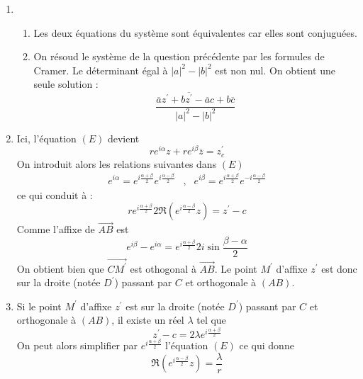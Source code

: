 \begin{enumerate}
 \item \begin{enumerate}
 \item Les deux équations du système sont équivalentes car elles sont conjuguées.
 \item On résoud le système de la question précédente par les formules de Cramer. Le déterminant égal à $|a|^2 -|b|^2$ est non nul.
On obtient une seule solution :
\begin{displaymath}
  \frac{\overline{a}z^\prime + b\overline{z^\prime} -\overline{a}c + b\overline{c}}{|a|^2 -|b|^2}
\end{displaymath}
\end{enumerate}
\item Ici, l'équation $(E)$ devient
\begin{displaymath}
 re^{i\alpha}z + re^{i\beta}\overline{z}=z^\prime _c
\end{displaymath}
On introduit alors les relations suivantes dans $(E)$
\begin{align*}
 e^{i\alpha} = e^{i\frac{\alpha + \beta}{2}}e^{i\frac{\alpha - \beta}{2}} &,&
 e^{i\beta} = e^{i\frac{\alpha + \beta}{2}}e^{-i\frac{\alpha - \beta}{2}}
\end{align*}
ce qui conduit  à :
\begin{displaymath}
 re^{i\frac{\alpha + \beta}{2}}2 \Re (e^{i\frac{\alpha - \beta}{2}}z) = z^\prime -c
\end{displaymath}
Comme l'affixe de $\overrightarrow{AB}$ est
\begin{displaymath}
 e^{i\beta}-e^{i\alpha}= e^{i\frac{\alpha + \beta}{2}}2i \sin \frac{\beta - \alpha}{2} 
\end{displaymath}
On obtient bien que $\overrightarrow{CM^\prime}$ est othogonal à $\overrightarrow{AB}$. Le point $M^\prime$ d'affixe $z^\prime$ est donc sur la droite (notée $D^\prime$) passant par $C$ et orthogonale à $(AB)$.
\item Si le point $M^\prime$ d'affixe $z^\prime$ est sur la droite (notée $D^\prime$) passant par $C$ et orthogonale à $(AB)$, il existe un réel $\lambda$ tel que
\begin{displaymath}
 z^\prime -c = 2\lambda e^{i\frac{\alpha + \beta}{2}}
\end{displaymath}
On peut alors simplifier par $e^{i\frac{\alpha + \beta}{2}}$ l'équation $(E)$ ce qui donne
\begin{displaymath}
 \Re (e^{i\frac{\alpha - \beta}{2}}z) = \frac{\lambda}{r}
\end{displaymath}

\end{enumerate}
